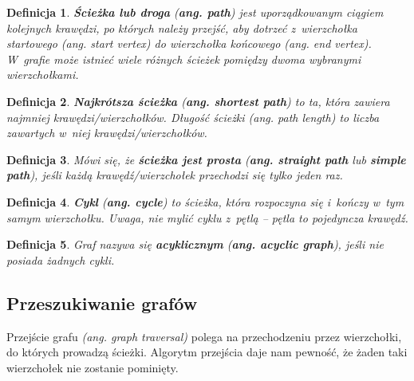 \documentclass[twoside,12pt]{report}
\newtheorem{definition}{Definicja} %
\begin{document}
\begin{definition}
\textbf{Ścieżka lub droga} (\textbf{ang. path}) jest uporządkowanym ciągiem kolejnych krawędzi, po których należy przejść, aby dotrzeć z~wierzchołka startowego (\textit{ang. start vertex}) do wierzchołka końcowego (\textit{ang. end vertex}). W~grafie może istnieć wiele różnych ścieżek pomiędzy dwoma wybranymi wierzchołkami.
\end{definition}

\begin{definition}
\textbf{Najkrótsza ścieżka} (\textbf{ang. shortest path}) to ta, która zawiera najmniej krawędzi/wierzchołków. Długość ścieżki (\textit{ang. path length}) to liczba zawartych w~niej krawędzi/wierzchołków.
\end{definition}

\begin{definition}
Mówi się, że \textbf{ścieżka jest prosta} (\textbf{ang. straight path} lub \textbf{simple path}), jeśli każdą krawędź/wierzchołek przechodzi się tylko jeden raz.
\end{definition}

\begin{definition}
\textbf{Cykl} (\textbf{ang. cycle}) to ścieżka, która rozpoczyna się i~kończy w~tym samym wierzchołku. Uwaga, nie mylić cyklu z~pętlą – pętla to pojedyncza krawędź.
\end{definition}

\begin{definition}
Graf nazywa się \textbf{acyklicznym} (\textbf{ang. acyclic graph}), jeśli nie posiada żadnych cykli.
\end{definition}

\subsection{Przeszukiwanie grafów}\label{sec:przeszukiwanie_grafow}
Przejście grafu \textit{(ang. graph traversal)} polega na przechodzeniu przez wierzchołki, do których prowadzą ścieżki. Algorytm przejścia daje nam pewność, że żaden taki wierzchołek nie zostanie pominięty.
\end{document}
